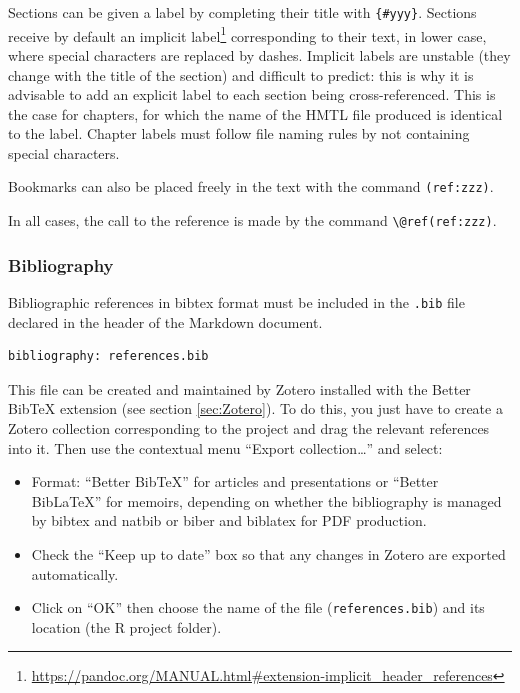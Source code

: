 \documentclass[
  12pt,
  american,
  a4paper,
  extrafontsizes,onecolumn,openright
  ]{memoir}
\providecommand{\tightlist}{%
  \setlength{\itemsep}{0pt}\setlength{\parskip}{0pt}}
\begin{document}
Sections can be given a label by completing their title with \texttt{\{\#yyy\}}.
Sections receive by default an implicit label\footnote{\url{https://pandoc.org/MANUAL.html\#extension-implicit_header_references}} corresponding to their text, in lower case, where special characters are replaced by dashes.
Implicit labels are unstable (they change with the title of the section) and difficult to predict: this is why it is advisable to add an explicit label to each section being cross-referenced.
This is the case for chapters, for which the name of the HMTL file produced is identical to the label.
Chapter labels must follow file naming rules by not containing special characters.

Bookmarks can also be placed freely in the text with the command \texttt{(ref:zzz)}.

In all cases, the call to the reference is made by the command \texttt{\textbackslash{}@ref(ref:zzz)}.

\hypertarget{bibliography}{%
\subsubsection{Bibliography}\label{bibliography}}

Bibliographic references in bibtex format must be included in the \texttt{.bib} file declared in the header of the Markdown document.

\begin{verbatim}
bibliography: references.bib
\end{verbatim}

This file can be created and maintained by Zotero installed with the Better BibTeX extension (see section \ref{sec:Zotero}).
To do this, you just have to create a Zotero collection corresponding to the project and drag the relevant references into it.
Then use the contextual menu \enquote{Export collection\ldots{}} and select:

\begin{itemize}
\tightlist
\item
  Format: \enquote{Better BibTeX} for articles and presentations or \enquote{Better BibLaTeX} for memoirs, depending on whether the bibliography is managed by bibtex and natbib or biber and biblatex for PDF production.
\item
  Check the \enquote{Keep up to date} box so that any changes in Zotero are exported automatically.
\item
  Click on \enquote{OK} then choose the name of the file (\texttt{references.bib}) and its location (the R project folder).
\end{itemize}
\end{document}
